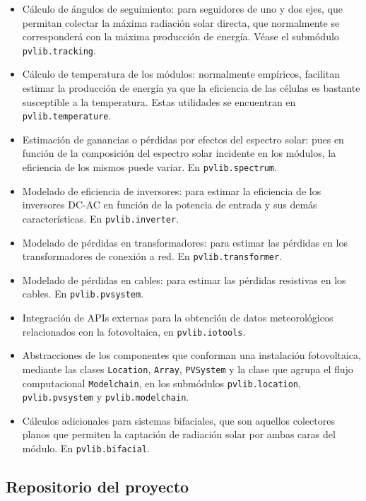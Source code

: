 \begin{itemize}
      \item Cálculo de ángulos de seguimiento: para seguidores de uno y dos ejes, que permitan colectar la máxima radiación solar directa, que normalmente se corresponderá con la máxima producción de energía. Véase el submódulo \lstinline{pvlib.tracking}.
      \item Cálculo de temperatura de los módulos: normalmente empíricos, facilitan estimar la producción de energía ya que la eficiencia de las células es bastante susceptible a la temperatura. Estas utilidades se encuentran en \lstinline{pvlib.temperature}.
      \item Estimación de ganancias o pérdidas por efectos del espectro solar: pues en función de la composición del espectro solar incidente en los módulos, la eficiencia de los mismos puede variar. En \lstinline{pvlib.spectrum}.
      \item Modelado de eficiencia de inversores: para estimar la eficiencia de los inversores DC-AC en función de la potencia de entrada y sus demás características. En \lstinline{pvlib.inverter}.
      \item Modelado de pérdidas en transformadores: para estimar las pérdidas en los transformadores de conexión a red. En \lstinline{pvlib.transformer}.
      \item Modelado de pérdidas en cables: para estimar las pérdidas resistivas en los cables. En \lstinline{pvlib.pvsystem}.
      \item Integración de APIs externas para la obtención de datos meteorológicos relacionados con la fotovoltaica, en \lstinline{pvlib.iotools}.
      \item Abstracciones de los componentes que conforman una instalación fotovoltaica, mediante las clases \lstinline{Location}, \lstinline{Array}, \lstinline{PVSystem} y la clase que agrupa el flujo computacional \lstinline{Modelchain}, en los submódulos \lstinline{pvlib.location}, \lstinline{pvlib.pvsystem} y \lstinline{pvlib.modelchain}.
      \item Cálculos adicionales para sistemas bifaciales, que son aquellos colectores planos que permiten la captación de radiación solar por ambas caras del módulo. En \lstinline{pvlib.bifacial}.

\end{itemize}

\subsection{Repositorio del proyecto} \label{ssct:pvlib:repositorio}

